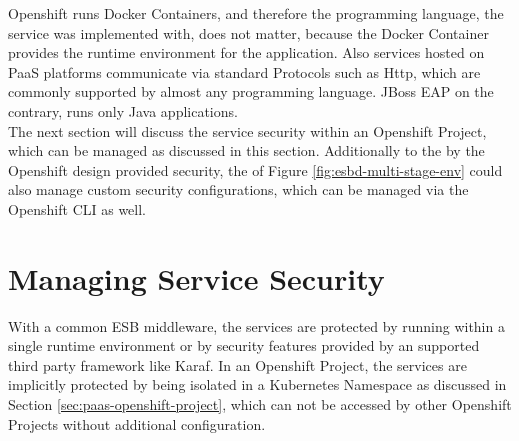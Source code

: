 Openshift runs Docker Containers, and therefore the programming language, the service was implemented with, does not matter, because the Docker Container provides the runtime environment for the application. Also services hosted on PaaS platforms communicate via standard Protocols such as Http, which are commonly supported by almost any programming language. JBoss EAP on the contrary, runs only Java applications. \\ 

The next section will discuss the service security within an Openshift Project, which can be managed as discussed in this section. Additionally to the by the Openshift design provided security, the  of Figure \vref{fig:esbd-multi-stage-env} could also manage custom security configurations, which can be managed via the Openshift CLI as well. 

\section{Managing Service Security}
\label{sec:esbd-service-security}
With a common ESB middleware, the services are protected by running within a single runtime environment or by security features provided by an supported third party framework like Karaf. In an Openshift Project, the services are implicitly protected by being isolated in a Kubernetes Namespace as discussed in Section \vref{sec:paas-openshift-project}, which can not be accessed by other Openshift Projects without additional configuration.


